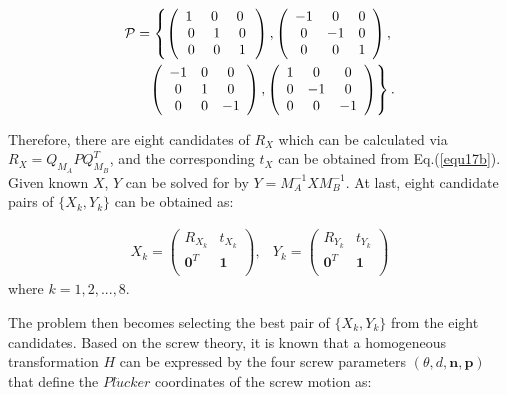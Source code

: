\documentclass[letterpaper, 10 pt, conference]{ieeeconf}  %
\begin{document}
\begin{equation}\label{equ19}
\begin{split}
{\cal P} = \left\{ \left(\begin{array}{ccc}
1\,\, & 0 \,\, & 0 \,\, \\
0 & 1 & 0\\
0 & 0 & 1 \end{array}\right) , \left(\begin{array}{ccc}
-1 & 0 & 0 \\
0 & -1 & 0\\
0 & 0 & 1 \end{array}\right), \right.\\
\left. \left(\begin{array}{ccc}
-1 & 0 & 0 \\
0 & 1 & 0\\
0 & 0 & -1 \end{array}\right), \left(\begin{array}{ccc}
1 & 0 & 0 \\
0 & -1 & 0\\
0 & 0 & -1 \end{array}\right)\right\}.
\end{split}
\end{equation}

Therefore, there are eight candidates of $R_{X}$ which can be calculated via $R_{X}=Q_{M_{A}}PQ_{M_{B}}^T$, and the corresponding $t_{X}$ can be obtained  from Eq.(\ref{equ17b}). Given known $X$, $Y$ can be solved for by $Y = M_A^{-1}XM_B^{-1}$. At last, eight candidate pairs of  $\{X_{k},Y_{k}\}$ can be obtained as:

\begin{equation}\label{equ20}
\begin{array}{cc}
X_{k}= \left( \begin{array}{cc}
       R_{X_k} & t_{X_k} \\
       \mathbf{0}^{T} & \mathbf{1}\\
\end{array} \right),&
Y_{k}= \left( \begin{array}{cc}
       R_{Y_k} & t_{Y_k} \\
       \mathbf{0}^{T} & \mathbf{1}\\
\end{array} \right)
\end{array}
\end{equation}
where $k = 1,2,...,8$.

The problem then becomes selecting the best pair of $\{X_k, Y_k\}$ from the eight candidates.
Based on the screw theory, it is known that a homogeneous transformation $H$ can be expressed by the four screw parameters $(\theta,d,\mathbf{n},\mathbf{p})$ that define the $Pl\ddot{u}cker$ coordinates of the screw motion as:
\end{document}
